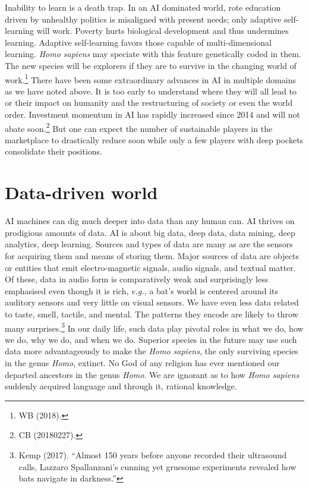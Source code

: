 \begin{multicols}{2}
Inability to learn is a death trap. In an AI dominated world, rote education driven by unhealthy politics is misaligned with present needs; only adaptive self-learning will work. Poverty hurts biological development and thus undermines learning. Adaptive self-learning favors those capable of multi-dimensional learning. \textit{Homo sapiens} may speciate with this feature genetically coded in them. The new species will be explorers if they are to survive in the changing world of work.\footnote{WB (2018).} There have been some extraordinary advances in AI in multiple domains as we have noted above. It is too early to understand where they will all lead to or their impact on humanity and the restructuring of society or even the world order. Investment momentum in AI has rapidly increased since 2014 and will not abate soon.\footnote{CB (20180227).}  But one can expect the number of sustainable players in the marketplace to drastically reduce soon while only a few players with deep pockets consolidate their positions.

\section{Data-driven world}


AI machines can dig much deeper into data than any human can. AI thrives on prodigious amounts of data. AI is about big data, deep data, data mining, deep analytics, deep learning. Sources and types of data are many as are the sensors for acquiring them and means of storing them. Major sources of data are objects or entities that emit electro-magnetic signals, audio signals, and textual matter. Of these, data in audio form is comparatively weak and surprisingly less emphasised even though it is rich, \textit{e.g.,} a bat's world is centered around its auditory sensors and very little on visual sensors. We have even less data related to taste, smell, tactile, and mental. The patterns they encode are likely to throw many surprises.\footnote{Kemp (2017). “Almost 150 years before anyone recorded their ultrasound calls, Lazzaro Spallanzani's cunning yet gruesome experiments revealed how bats navigate in darkness.”}  In our daily life, such data play pivotal roles in what we do, how we do, why we do, and when we do. Superior species in the future may use such data more advantageously to make the \textit{Homo sapiens}, the only surviving species in the genus \textit{Homo}, extinct. No God of any religion has ever mentioned our departed ancestors in the genus \textit{Homo}. We are ignorant as to how \textit{Homo sapiens} suddenly acquired language and through it, rational knowledge. 
\smallskip


\end{multicols}
